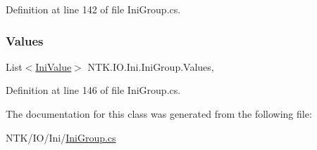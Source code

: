Definition at line 142 of file Ini\+Group.\+cs.

\mbox{\label{class_n_t_k_1_1_i_o_1_1_ini_1_1_ini_group_a81d6a427065677aa56bd10c2cad860e4}} 
\subsubsection{\texorpdfstring{Values}{Values}}
{\footnotesize\ttfamily List$<$\mbox{\hyperlink{class_n_t_k_1_1_i_o_1_1_ini_1_1_ini_value}{Ini\+Value}}$>$ N\+T\+K.\+I\+O.\+Ini.\+Ini\+Group.\+Values\hspace{0.3cm}{\ttfamily [get]}, {\ttfamily [set]}}







Definition at line 146 of file Ini\+Group.\+cs.



The documentation for this class was generated from the following file\+:\begin{DoxyCompactItemize}
\item 
N\+T\+K/\+I\+O/\+Ini/\mbox{\hyperlink{_ini_group_8cs}{Ini\+Group.\+cs}}\end{DoxyCompactItemize}
